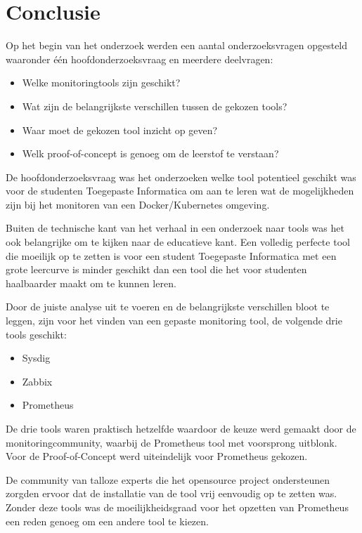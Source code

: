 \chapter{Conclusie}
\label{ch:conclusie}

Op het begin van het onderzoek werden een aantal onderzoeksvragen opgesteld waaronder één hoofdonderzoeksvraag en meerdere deelvragen:

\begin{itemize}
    \item Welke monitoringtools zijn geschikt?
    \item Wat zijn de belangrijkste verschillen tussen de gekozen tools?
    \item Waar moet de gekozen tool inzicht op geven?
    \item Welk proof-of-concept is genoeg om de leerstof te verstaan?
\end{itemize}

De hoofdonderzoeksvraag was het onderzoeken welke tool potentieel geschikt was voor de studenten Toegepaste Informatica om aan te leren wat de mogelijkheden zijn bij het monitoren van een Docker/Kubernetes omgeving.  

Buiten de technische kant van het verhaal in een onderzoek naar tools was het ook belangrijke om te kijken naar de educatieve kant. Een volledig perfecte tool die moeilijk op te zetten is voor een student Toegepaste Informatica met een grote leercurve is minder geschikt dan een tool die het voor studenten haalbaarder maakt om te kunnen leren. 

Door de juiste analyse uit te voeren en de belangrijkste verschillen bloot te leggen, zijn voor het vinden van een gepaste monitoring tool, de volgende drie tools geschikt:

\begin{itemize}
    \item Sysdig
    \item Zabbix
    \item Prometheus
\end{itemize}

De drie tools waren praktisch hetzelfde waardoor de keuze werd gemaakt door de monitoringcommunity, waarbij de Prometheus tool met voorsprong uitblonk. Voor de Proof-of-Concept werd uiteindelijk voor Prometheus gekozen. 

De community van talloze experts die het opensource project ondersteunen zorgden ervoor dat de installatie van de tool vrij eenvoudig op te zetten was. Zonder deze tools was de moeilijkheidsgraad voor het opzetten van Prometheus een reden genoeg om een andere tool te kiezen. 

